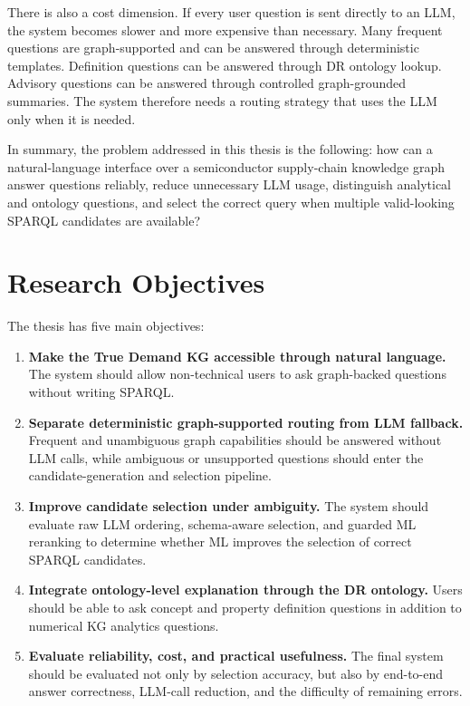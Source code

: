\documentclass[
  12pt,
  english,
  oneside]{report}
\begin{document}
There is also a cost dimension. If every user question is sent directly to an LLM, the system becomes slower and more expensive than necessary. Many frequent questions are graph-supported and can be answered through deterministic templates. Definition questions can be answered through DR ontology lookup. Advisory questions can be answered through controlled graph-grounded summaries. The system therefore needs a routing strategy that uses the LLM only when it is needed.

In summary, the problem addressed in this thesis is the following: how can a natural-language interface over a semiconductor supply-chain knowledge graph answer questions reliably, reduce unnecessary LLM usage, distinguish analytical and ontology questions, and select the correct query when multiple valid-looking SPARQL candidates are available?

\section{Research Objectives}

The thesis has five main objectives:

\begin{enumerate}
    \item \textbf{Make the True Demand KG accessible through natural language.} The system should allow non-technical users to ask graph-backed questions without writing SPARQL.
    \item \textbf{Separate deterministic graph-supported routing from LLM fallback.} Frequent and unambiguous graph capabilities should be answered without LLM calls, while ambiguous or unsupported questions should enter the candidate-generation and selection pipeline.
    \item \textbf{Improve candidate selection under ambiguity.} The system should evaluate raw LLM ordering, schema-aware selection, and guarded ML reranking to determine whether ML improves the selection of correct SPARQL candidates.
    \item \textbf{Integrate ontology-level explanation through the DR ontology.} Users should be able to ask concept and property definition questions in addition to numerical KG analytics questions.
    \item \textbf{Evaluate reliability, cost, and practical usefulness.} The final system should be evaluated not only by selection accuracy, but also by end-to-end answer correctness, LLM-call reduction, and the difficulty of remaining errors.
\end{enumerate}
\end{document}
